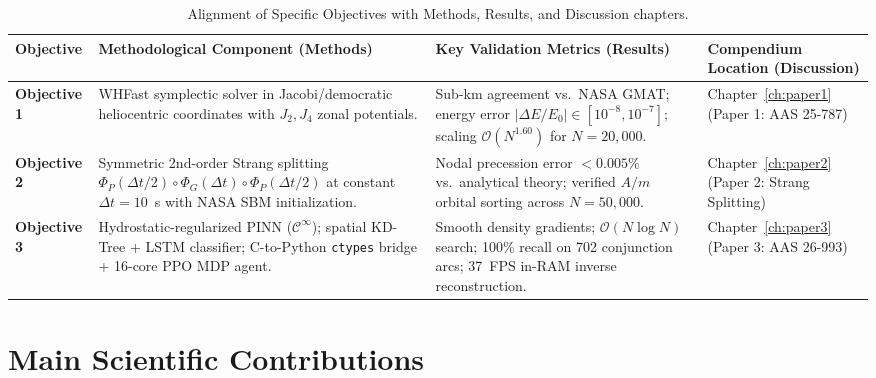 \begin{table}[htbp]
\centering
\caption{Alignment of Specific Objectives with Methods, Results, and Discussion chapters.}
\label{tab:objective_alignment}
\footnotesize
\begin{tabularx}{\textwidth}{l X X l}
\toprule
\textbf{Objective} & \textbf{Methodological Component (Methods)} & \textbf{Key Validation Metrics (Results)} & \textbf{Compendium Location (Discussion)} \\
\midrule
\textbf{Objective 1} & WHFast symplectic solver in Jacobi/democratic heliocentric coordinates with $J_2, J_4$ zonal potentials. & Sub-km agreement vs.\ NASA GMAT; energy error $|\Delta E/E_0| \in [10^{-8}, 10^{-7}]$; scaling $\mathcal{O}(N^{1.60})$ for $N = 20,000$. & Chapter~\ref{ch:paper1} (Paper 1: AAS 25-787) \\
\addlinespace
\textbf{Objective 2} & Symmetric 2nd-order Strang splitting $\Phi_P(\Delta t/2) \circ \Phi_G(\Delta t) \circ \Phi_P(\Delta t/2)$ at constant $\Delta t = 10$~s with NASA SBM initialization. & Nodal precession error $< 0.005\%$ vs.\ analytical theory; verified $A/m$ orbital sorting across $N = 50,000$. & Chapter~\ref{ch:paper2} (Paper 2: Strang Splitting) \\
\addlinespace
\textbf{Objective 3} & Hydrostatic-regularized PINN ($\mathcal{C}^\infty$); spatial KD-Tree + LSTM classifier; C-to-Python \texttt{ctypes} bridge + 16-core PPO MDP agent. & Smooth density gradients; $\mathcal{O}(N \log N)$ search; 100\% recall on 702 conjunction arcs; 37~FPS in-RAM inverse reconstruction. & Chapter~\ref{ch:paper3} (Paper 3: AAS 26-993) \\
\bottomrule
\end{tabularx}
\end{table}

\section{Main Scientific Contributions}
\label{sec:contributions}

